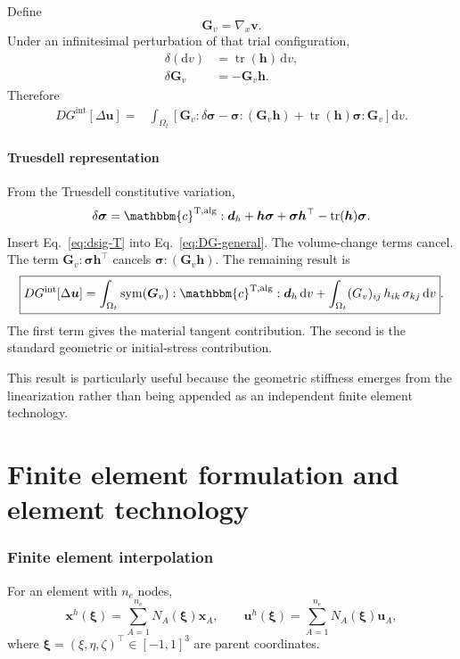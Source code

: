 \documentclass[11pt,a4paper]{article}
\newcommand{\bs}[1]{\boldsymbol{#1}}
\newcommand{\dd}{\mathrm{d}}
\newcommand{\tr}{\operatorname{tr}}
\newcommand{\sym}{\operatorname{sym}}
\newcommand{\sig}{\bs{\sigma}}
\newcommand{\calgT}{\mathbbm{c}^{\mathrm{T,alg}}}
\begin{document}
Define
\begin{equation}
\bs G_v=\nabla_x\bs v.
\end{equation}
Under an infinitesimal perturbation of that trial configuration,
\begin{align}
\delta(\dd v)&=\tr(\bs{h})\,\dd v,
\label{eq:dv-var}
\\
\delta\bs G_v&=-\bs G_v\bs h.
\label{eq:A-var}
\end{align}
Therefore
\begin{align}
DG^{\mathrm{int}}[\Delta\bs{u}]
={}&
\int_{\Omega_t}
\left[
\bs G_v:\delta\sig
-\sig:(\bs G_v\bs h)
+\tr(\bs{h})\sig:\bs G_v
\right]\dd v.
\label{eq:DG-general}
\end{align}

\subsection{Truesdell representation}

From the Truesdell constitutive variation,
\begin{equation}
\delta\sig
=
\calgT:\bs{d}_h
+\bs{h}\sig
+\sig\bs{h}^\top
-\tr(\bs{h})\sig.
\label{eq:dsig-T}
\end{equation}
Insert Eq.~\eqref{eq:dsig-T} into Eq.~\eqref{eq:DG-general}. The volume-change terms cancel. The term $\bs G_v:\sig\bs{h}^\top$ cancels $\sig:(\bs G_v\bs h)$. The remaining result is
\begin{equation}
\boxed{
DG^{\mathrm{int}}[\Delta\bs{u}]
=
\int_{\Omega_t}
\sym(\bs G_v):\calgT:\bs{d}_h\,\dd v
+
\int_{\Omega_t}
(G_v)_{ij}\,h_{ik}\,\sigma_{kj}\,\dd v
}.
\label{eq:DG-Truesdell}
\end{equation}
The first term gives the material tangent contribution. The second is the standard geometric or initial-stress contribution.

This result is particularly useful because the geometric stiffness emerges from the linearization rather than being appended as an independent finite element technology.

\part{Finite element formulation and element technology}
\section{Finite element interpolation}

For an element with $n_e$ nodes,
\begin{equation}
\bs{x}^h(\bs{\xi})
=
\sum_{A=1}^{n_e}N_A(\bs{\xi})\bs{x}_A,
\qquad
\bs{u}^h(\bs{\xi})
=
\sum_{A=1}^{n_e}N_A(\bs{\xi})\bs{u}_A,
\label{eq:interpolation}
\end{equation}
where $\bs{\xi}=(\xi,\eta,\zeta)^\top\in[-1,1]^3$ are parent coordinates.
\end{document}
